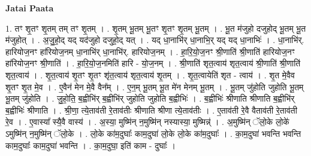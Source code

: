 \documentclass[17pt]{extarticle}
\begin{document}
\textbf{Jatai Paata} \newline

1. तꣳ शृ॒तꣳ शृ॒तम् तम् तꣳ शृ॒तम् । . शृ॒तम् भू॒तम् भू॒तꣳ शृ॒तꣳ शृ॒तम् भू॒तम् । . भू॒त म॑जुहो दजुहोद् भू॒तम् भू॒त म॑जुहोत् । . अ॒जु॒हो॒द् यद् यद॑जुहो दजुहो॒द् यत् । . यद् धा॒नाभि॑र् धा॒नाभि॒र् यद् यद् धा॒नाभिः॑ । . धा॒नाभि॑र्. हारियोज॒नꣳ हा॑रियोज॒नम् धा॒नाभि॑र् धा॒नाभि॑र्. हारियोज॒नम् । . हा॒रि॒यो॒ज॒नꣳ श्री॒णाति॑ श्री॒णाति॑ हारियोज॒नꣳ हा॑रियोज॒नꣳ श्री॒णाति॑ । . हा॒रि॒यो॒ज॒नमिति॑ हारि - यो॒ज॒नम् । . श्री॒णाति॑ शृत॒त्वाय॑ शृत॒त्वाय॑ श्री॒णाति॑ श्री॒णाति॑ शृत॒त्वाय॑ । . शृ॒त॒त्वाय॑ शृ॒तꣳ शृ॒तꣳ शृ॑त॒त्वाय॑ शृत॒त्वाय॑ शृ॒तम् । . शृ॒त॒त्वायेति॑ शृत - त्वाय॑ । . शृ॒त मे॒वैव शृ॒तꣳ शृ॒त मे॒व । . ए॒वैन॑ मेन मे॒वै वैन᳚म् । . ए॒न॒म् भू॒तम् भू॒त मे॑न मेनम् भू॒तम् । . भू॒तम् जु॑होति जुहोति भू॒तम् भू॒तम् जु॑होति । . जु॒हो॒ति॒ ब॒ह्वीभि॑र् ब॒ह्वीभि॑र् जुहोति जुहोति ब॒ह्वीभिः॑ । . ब॒ह्वीभिः॑ श्रीणाति श्रीणाति ब॒ह्वीभि॑र् ब॒ह्वीभिः॑ श्रीणाति । . श्री॒णा॒ त्ये॒ताव॑ती रे॒ताव॑तीः श्रीणाति श्रीणा त्ये॒ताव॑तीः । . ए॒ताव॑ती रे॒वै वैताव॑ती रे॒ताव॑ती रे॒व । . ए॒वास्या᳚ स्यै॒वै वास्य॑ । . अ॒स्या॒ मुष्मि॑न् न॒मुष्मि॑न् नस्यास्या॒ मुष्मिन्न्॑ । . अ॒मुष्मि॑न् ॅलो॒के लो॒के॑ ऽमुष्मि॑न् न॒मुष्मि॑न् ॅलो॒के । . लो॒के का॑म॒दुघाः᳚ काम॒दुघा॑ लो॒के लो॒के का॑म॒दुघाः᳚ । . का॒म॒दुघा॑ भवन्ति भवन्ति काम॒दुघाः᳚ काम॒दुघा॑ भवन्ति । . का॒म॒दुघा॒ इति॑ काम - दुघाः᳚ । \newline
\end{document}
